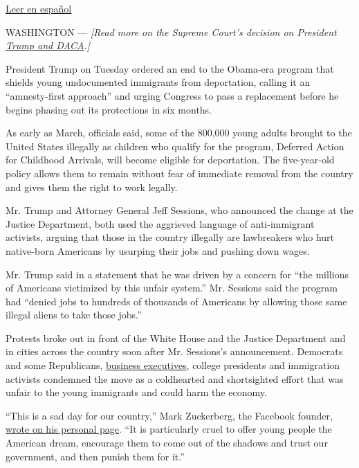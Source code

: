 \href{https://www.nytimes3xbfgragh.onion/es/2017/09/05/donald-trump-revoca-daca-dreamers/}{Leer
en español}

WASHINGTON --- \emph{{[}Read more on the Supreme Court's decision on
President}
\href{https://www.nytimes3xbfgragh.onion/2020/06/18/us/trump-daca-supreme-court.html}{\emph{Trump
and DACA}}\emph{.{]}}

President Trump on Tuesday ordered an end to the Obama-era program that
shields young undocumented immigrants from deportation, calling it an
``amnesty-first approach'' and urging Congress to pass a replacement
before he begins phasing out its protections in six months.

As early as March, officials said, some of the 800,000 young adults
brought to the United States illegally as children who qualify for the
program, Deferred Action for Childhood Arrivals, will become eligible
for deportation. The five-year-old policy allows them to remain without
fear of immediate removal from the country and gives them the right to
work legally.

Mr. Trump and Attorney General Jeff Sessions, who announced the change
at the Justice Department, both used the aggrieved language of
anti-immigrant activists, arguing that those in the country illegally
are lawbreakers who hurt native-born Americans by usurping their jobs
and pushing down wages.

Mr. Trump said in a statement that he was driven by a concern for ``the
millions of Americans victimized by this unfair system.'' Mr. Sessions
said the program had ``denied jobs to hundreds of thousands of Americans
by allowing those same illegal aliens to take those jobs.''

Protests broke out in front of the White House and the Justice
Department and in cities across the country soon after Mr. Sessions's
announcement. Democrats and some Republicans,
\href{https://www.nytimes3xbfgragh.onion/2017/09/05/business/chief-executives-see-a-sad-day-after-trumps-daca-decision.html?hp\&action=click\&pgtype=Homepage\&clickSource=story-heading\&module=b-lede-package-region\&region=top-news\&WT.nav=top-news}{business
executives}, college presidents and immigration activists condemned the
move as a coldhearted and shortsighted effort that was unfair to the
young immigrants and could harm the economy.

``This is a sad day for our country,'' Mark Zuckerberg, the Facebook
founder,
\href{https://www.facebookcorewwwi.onion/zuck/posts/10104016069261801}{wrote
on his personal page}. ``It is particularly cruel to offer young people
the American dream, encourage them to come out of the shadows and trust
our government, and then punish them for it.''

